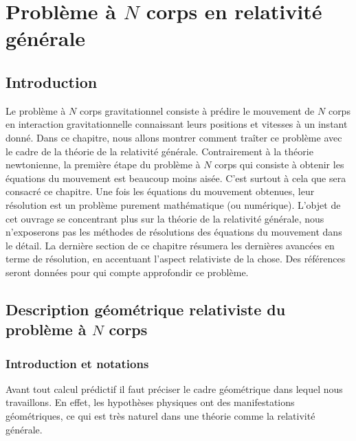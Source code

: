 \chapter{Problème à $N$ corps en relativité générale}

	\section{Introduction}

		Le problème à $N$ corps gravitationnel consiste à prédire le mouvement de $N$ corps en interaction gravitationnelle connaissant leurs positions et vitesses à un instant donné. Dans ce chapitre, nous allons montrer comment traîter ce problème avec le cadre de la théorie de la relativité générale. Contrairement à la théorie newtonienne, la première étape du problème à $N$ corps qui consiste à obtenir les équations du mouvement est beaucoup moins aisée. C'est surtout à cela que sera consacré ce chapitre. Une fois les équations du mouvement obtenues, leur résolution est un problème purement mathématique (ou numérique). L'objet de cet ouvrage se concentrant plus sur la théorie de la relativité générale, nous n'exposerons pas les méthodes de résolutions des équations du mouvement dans le détail. La dernière section de ce chapitre résumera les dernières avancées en terme de résolution, en accentuant l'aspect relativiste de la chose. Des références seront données pour qui compte approfondir ce problème.


	\section{Description géométrique relativiste du problème à $N$ corps}

		\subsection{Introduction et notations}
			Avant tout calcul prédictif il faut préciser le cadre géométrique dans lequel nous travaillons. En effet, les hypothèses physiques ont des manifestations géométriques, ce qui est très naturel dans une théorie comme la relativité générale. 

